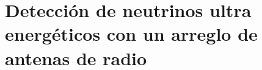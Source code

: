 \documentclass[a4paper,11pt]{book}
\begin{document}
\frontmatter

\renewcommand{\listtablename}{Índice de tablas}
\renewcommand{\tablename}{Tabla} 




\newpage
\thispagestyle{empty}
\mbox{}



\tableofcontents


% 
% 
% 
% 
% 
% 
% 
% 
\part{Detecci\'on de neutrinos ultra energ\'eticos con un arreglo de antenas de radio}






% 
% 
% 
% 
% 
% 
% 
\end{document}
